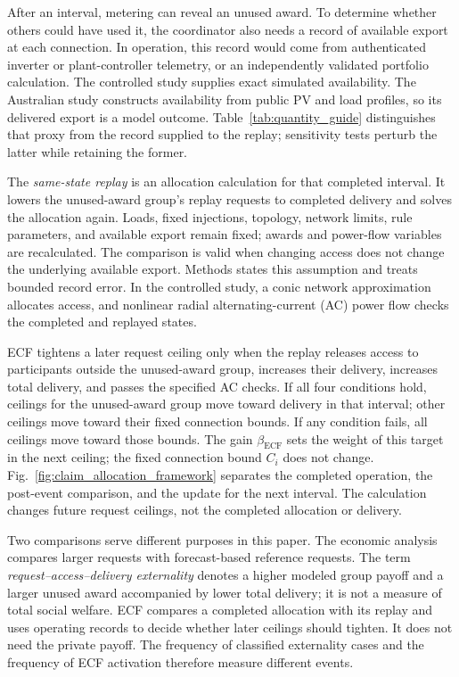 \documentclass[twoside,twocolumn,9pt]{article}
\begin{document}
After an interval, metering can reveal an unused award. To determine whether
others could have used it, the coordinator also needs a record of available
export at each connection. In operation, this record would come from authenticated inverter or
plant-controller telemetry, or an independently validated portfolio calculation. The controlled study supplies exact simulated availability. The
Australian study constructs availability from public PV and load profiles, so
its delivered export is a model outcome. Table~\ref{tab:quantity_guide}
distinguishes that proxy from the record supplied to the replay; sensitivity
tests perturb the latter while retaining the former.

The \emph{same-state replay} is an allocation calculation for that completed
interval. It lowers the unused-award group's replay requests to completed
delivery and solves the allocation again. Loads, fixed injections, topology,
network limits, rule parameters, and available export remain fixed; awards and
power-flow variables are recalculated. The comparison is valid when changing
access does not change the underlying available export. Methods states this
assumption and treats bounded record error. In the controlled study, a conic
network approximation allocates access, and nonlinear radial alternating-current
(AC) power flow checks the completed and replayed states.

ECF tightens a later request ceiling only when the replay releases access to
participants outside the unused-award group, increases their delivery, increases
total delivery, and passes the specified AC checks. If all four conditions
hold, ceilings for the unused-award group move toward delivery in that interval;
other ceilings move toward their fixed connection bounds. If any condition
fails, all ceilings move toward those bounds. The gain $\beta_{\mathrm{ECF}}$
sets the weight of this target in the next ceiling; the fixed connection
bound $C_i$ does not change.
Fig.~\ref{fig:claim_allocation_framework} separates the completed operation,
the post-event comparison, and the update for the next interval. The calculation
changes future request ceilings, not the completed allocation or delivery.

Two comparisons serve different purposes in this paper. The economic analysis
compares larger requests with forecast-based reference requests. The term
\emph{request--access--delivery externality} denotes a higher modeled group
payoff and a larger unused award accompanied by lower total delivery; it is
not a measure of total social welfare. ECF compares a completed
allocation with its replay and uses operating records to decide whether later
ceilings should tighten. It does not need the private payoff. The frequency of
classified externality cases and the frequency of ECF activation therefore
measure different events.
\end{document}
